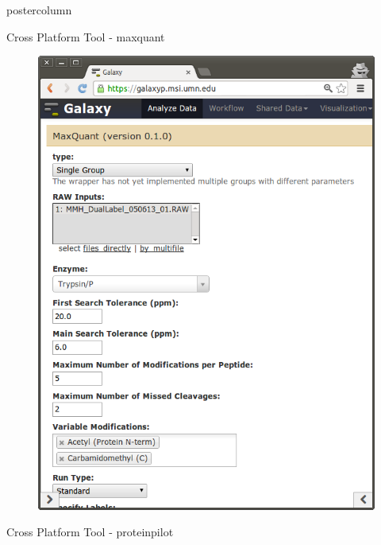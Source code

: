\documentclass[final]{beamer}
\begin{document}
\begin{frame}
\begin{columns}
\begin{column}{.33\textwidth}
\begin{beamercolorbox}[center,wd=\textwidth]{postercolumn}
\begin{minipage}[T]{.95\textwidth}
{\begin{block}{Cross Platform Tool - maxquant}
\begin{figure}
                \includegraphics[scale=0.5]{maxquant_screenshot.png}
              \end{figure}
            \end{block}
            \vfill
            \begin{block}{Cross Platform Tool - proteinpilot}
              \begin{figure}

\end{figure}
\end{block}}
\end{minipage}
\end{beamercolorbox}
\end{column}
\end{columns}
\end{frame}
\end{document}
